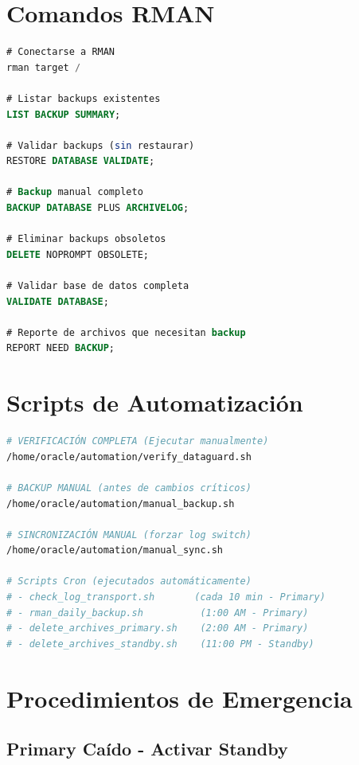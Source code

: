 \documentclass[11pt, a4paper]{report}
\begin{document}
\section{Comandos RMAN}

\begin{lstlisting}[language=SQL, caption={Operaciones de Backup con RMAN}]
# Conectarse a RMAN
rman target /

# Listar backups existentes
LIST BACKUP SUMMARY;

# Validar backups (sin restaurar)
RESTORE DATABASE VALIDATE;

# Backup manual completo
BACKUP DATABASE PLUS ARCHIVELOG;

# Eliminar backups obsoletos
DELETE NOPROMPT OBSOLETE;

# Validar base de datos completa
VALIDATE DATABASE;

# Reporte de archivos que necesitan backup
REPORT NEED BACKUP;
\end{lstlisting}

\section{Scripts de Automatización}

\begin{lstlisting}[language=bash, caption={Scripts Disponibles en /home/oracle/automation/}]
# VERIFICACIÓN COMPLETA (Ejecutar manualmente)
/home/oracle/automation/verify_dataguard.sh

# BACKUP MANUAL (antes de cambios críticos)
/home/oracle/automation/manual_backup.sh

# SINCRONIZACIÓN MANUAL (forzar log switch)
/home/oracle/automation/manual_sync.sh

# Scripts Cron (ejecutados automáticamente)
# - check_log_transport.sh       (cada 10 min - Primary)
# - rman_daily_backup.sh          (1:00 AM - Primary)
# - delete_archives_primary.sh    (2:00 AM - Primary)
# - delete_archives_standby.sh    (11:00 PM - Standby)
\end{lstlisting}

\section{Procedimientos de Emergencia}

\subsection{Primary Caído - Activar Standby}
\end{document}
